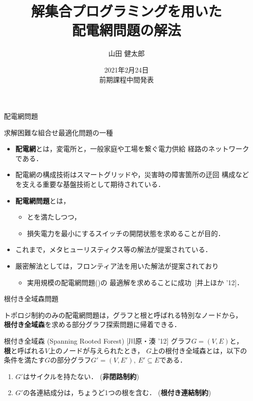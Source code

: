 \documentclass[dvipdfmx,11pt]{beamer}
\title{解集合プログラミングを用いた\\配電網問題の解法}
\author[山田 健太郎]{山田 健太郎}
\date{2021年2月24日\\前期課程中間発表}
\institute{番原研究室}
\begin{document}
\begin{frame}{}
  \titlepage
\end{frame}

\begin{frame}{配電網問題}
  \begin{alertblock}{}\centering
    求解困難な組合せ最適化問題の一種
  \end{alertblock}
  \vfill
  \begin{itemize}
  \item \alert{\bf 配電網}とは，変電所と，一般家庭や工場を繋ぐ電力供給
    経路のネットワークである．
  \item  配電網の構成技術はスマートグリッドや，災害時の障害箇所の迂回
    構成などを支える重要な基盤技術として期待されている．
  \item \alert{\bf 配電網問題}とは，
    \begin{itemize}
    \item {}とを満たしつつ，
    \item 損失電力を最小にするスイッチの開閉状態を求めることが目的．
    \end{itemize}
  \item これまで，メタヒューリスティクス等の解法が提案されている．
  \item 厳密解法としては，フロンティア法を用いた解法が提案されており
    \begin{itemize}
    \item 実用規模の配電網問題()の
      最適解を求めることに成功~[井上ほか '12]．
    \end{itemize}
  \end{itemize}
\end{frame}
\begin{frame}{根付き全域森問題}
 \begin{alertblock}{}
  トポロジ制約のみの配電網問題は，グラフと根と呼ばれる特別なノードから，
  \alert{\bf 根付き全域森}を求める部分グラフ探索問題に帰着できる．
 \end{alertblock}
 \vfill
 \begin{block}{根付き全域森 (Spanning Rooted Forest) [川原・湊 '12]}
  グラフ$G=(V,E)$と，
  \textbf{根}と呼ばれる$V$上のノードが与えられたとき，
  $G$上の根付き全域森とは，以下の条件を満たす$G$の部分グラフ$G'=(V,E'),\ E' \subseteq E$である．
  \begin{enumerate}
   \item $G'$はサイクルを持たない． (\alert{\bf 非閉路制約})
   \item $G'$の各連結成分は，ちょうど1つの根を含む． (\alert{\bf 根付き連結制約})
  \end{enumerate}
 \end{block}
\end{frame}
\end{document}
